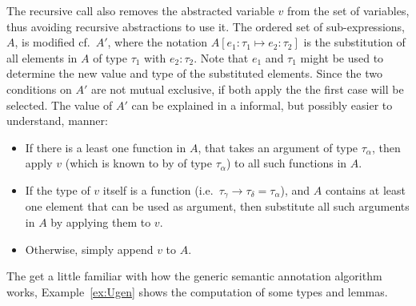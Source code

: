 \begin{definition}
The recursive call also removes the abstracted variable $v$ from the set of variables, thus avoiding recursive abstractions to use it. The ordered set of sub-expressions, $A$, is modified cf.\ $A'$, where the notation $A[e_1 : \tau_1 \mapsto e_2 : \tau_2]$ is the substitution of all elements in $A$ of type $\tau_1$ with $e_2 : \tau_2$. Note that $e_1$ and $\tau_1$ might be used to determine the new value and type of the substituted elements. Since the two conditions on $A'$ are not mutual exclusive, if both apply the the first case will be selected. The value of $A'$ can be explained in a informal, but possibly easier to understand, manner: 
\begin{itemize}
	\item If there is a least one function in $A$, that takes an argument of type $\tau_\alpha$, then apply $v$ (which is known to by of type $\tau_\alpha$) to all such functions in $A$.
	\item If the type of $v$ itself is a function (i.e.\ $\tau_\gamma \to \tau_\delta = \tau_\alpha$), and $A$ contains at least one element that can be used as argument, then substitute all such arguments in $A$ by applying them to $v$.
	\item Otherwise, simply append $v$ to $A$.
\end{itemize} 
\label{def:Ugen}
\vspace{-1em}
\done
\end{definition}
\clearpage

The get a little familiar with how the generic semantic annotation algorithm works, Example~\ref{ex:Ugen} shows the computation of some types and lemmas.

